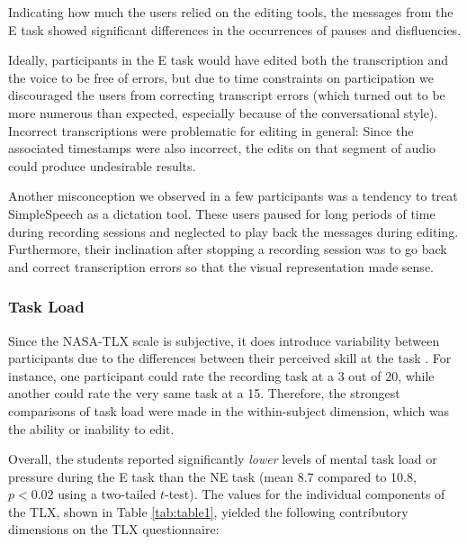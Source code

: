 
Indicating how much the users relied on the editing tools, the messages from the E task showed significant differences in the occurrences of pauses and disfluencies. 

Ideally, participants in the E task would have edited both the transcription and the voice to be free of errors, but due to time constraints on participation we discouraged the users from correcting transcript errors (which turned out to be more numerous than expected, especially because of the conversational style).
Incorrect transcriptions were problematic for editing in general: Since the associated timestamps were also incorrect, the edits on that segment of audio could produce undesirable results. 


Another misconception we observed in a few participants was a tendency to treat SimpleSpeech as a dictation tool. 
These users paused for long periods of time during recording sessions and neglected to play back the messages during editing. 
Furthermore, their inclination after stopping a recording session was to go back and correct transcription errors so that the visual representation made sense.

\subsubsection{Task Load}
Since the NASA-TLX scale is subjective, it does introduce variability between participants due to the differences between their perceived skill at the task \cite{nasatlx}. 
For instance, one participant could rate the recording task at a 3 out of 20, while another could rate the very same task at a 15.
Therefore, the strongest comparisons of task load were made in the within-subject dimension, which was the ability or inability to edit.

Overall, the students reported significantly \emph{lower} levels of mental task load or pressure during the E task than the NE task (mean 8.7 compared to 10.8, $p<0.02$ using a two-tailed $t$-test). 
The values for the individual components of the TLX, shown in Table \ref{tab:table1}, yielded the following contributory dimensions on the TLX questionnaire:

